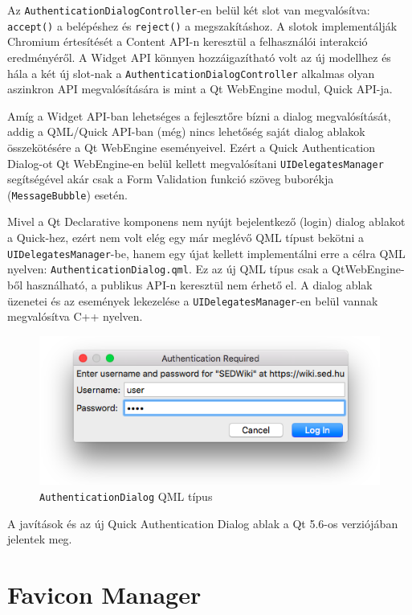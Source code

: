 \documentclass[12pt]{report}
\begin{document}
Az \texttt{AuthenticationDialogController}-en
belül két slot van megvalósítva: \texttt{accept()} a belépéshez és \texttt{reject()} a
megszakításhoz. A slotok implementálják Chromium értesítését a Content API-n keresztül a
felhasználói interakció eredményéről. A Widget API könnyen hozzáigazítható volt az új
modellhez és hála a két új slot-nak a \texttt{AuthenticationDialogController} alkalmas
olyan aszinkron API megvalósítására is mint a Qt WebEngine modul, Quick API-ja.

Amíg a Widget API-ban lehetséges a fejlesztőre bízni a dialog megvalósítását, addig a
QML/Quick API-ban (még) nincs lehetőség saját dialog ablakok összekötésére a Qt WebEngine
eseményeivel. Ezért a Quick Authentication Dialog-ot Qt WebEngine-en belül kellett
megvalósítani \texttt{UIDelegatesManager} segítségével akár csak a Form Validation funkció
szöveg buborékja (\texttt{MessageBubble}) esetén.

Mivel a Qt Declarative komponens nem nyújt bejelentkező (login) dialog ablakot a Quick-hez,
ezért nem volt elég egy már meglévő QML típust bekötni a \\
\texttt{UIDelegatesManager}-be, hanem egy újat kellett implementálni erre a célra
QML nyelven: \texttt{AuthenticationDialog.qml}. Ez az új QML típus csak a QtWebEngine-ből
használható, a publikus API-n keresztül nem érhető el. A dialog ablak üzenetei és az
események lekezelése a \texttt{UIDelegatesManager}-en belül vannak megvalósítva C++
nyelven.

\begin{figure}[ht]
    \centering
    \includegraphics[scale=0.75]{ad-quick-screenshot}
    \caption{
        \label{fig:ad-quick-screenshot}
        \texttt{AuthenticationDialog} QML típus
    }
\end{figure}

A javítások és az új Quick Authentication Dialog ablak a Qt 5.6-os verziójában jelentek meg.


\section{Favicon Manager}
\end{document}
